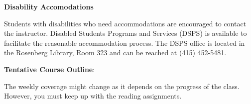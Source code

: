 \documentclass[11pt]{article}
\begin{document}
\hspace{3mm}

\textbf{Disability Accomodations}

\hspace{3mm}

Students with disabilities who need accommodations are encouraged to contact
the instructor. Disabled Students Programs and Services (DSPS) is available to
facilitate the reasonable accommodation process. The DSPS office is located in
the Rosenberg Library, Room 323 and can be reached at (415) 452-5481.


\hspace{3mm}

\textbf {\large Tentative Course Outline}:

The weekly coverage might change as it depends on the progress of the class.
However, you must keep up with the reading assignments.
\end{document}
